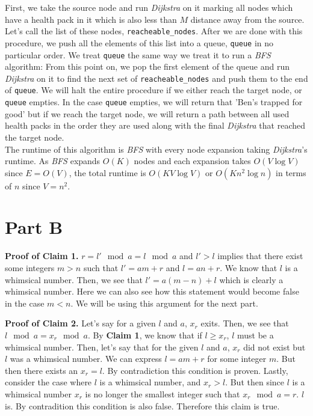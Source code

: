 \documentclass[12pt,twoside]{article}
\begin{document}
\begin{problems}
First, we take the source node and run \emph{Dijkstra} on it marking all nodes which have a health pack in it which is also less than $M$ distance away from the source. Let's call the list of these nodes, {\tt reacheable\_nodes}. After we are done with this procedure, we push all the elements of this list into a queue, {\tt queue} in no particular order. We treat {\tt queue} the same way we treat it to run a \emph{BFS} algorithm: From this point on, we pop the first element of the queue and run \emph{Dijkstra} on it to find the next set of {\tt reacheable\_nodes} and push them to the end of {\tt queue}. We will halt the entire procedure if we either reach the target node, or {\tt queue} empties. In the case {\tt queue} empties, we will return that 'Ben's trapped for good' but if we reach the target node, we will return a path between all used health packs in the order they are used along with the final \emph{Dijkstra} that reached the target node.\\

The runtime of this algorithm is \emph{BFS} with every node expansion taking \emph{Dijkstra}'s runtime. As \emph{BFS} expands $O(K)$ nodes and each expansion takes $O(V \log V)$ since $E = O(V)$, the total runtime is $O(K V \log V)$ or $O(K n^2 \log n)$ in terms of $n$ since $V = n^2$.


\section*{Part B}
\problem %
\begin{problemparts}

\problempart %

\textbf{Proof of Claim 1.}
$r = l' \mod a = l \mod a$ and $l' > l$ implies that there exist some integers $m > n$ such that $l' = a m + r$ and $l = a n + r$. We know that $l$ is a whimsical number. Then, we see that $l' = a (m - n) + l$ which is clearly a whimsical number. Here we can also see how this statement would become false in the case $m < n$. We will be using this argument for the next part.

\textbf{Proof of Claim 2.}
Let's say for a given $l$ and $a$, $x_r$ exits. Then, we see that $l \mod a = x_r \mod a$. By \textbf{Claim 1}, we know that if $l \geq x_r$, $l$ must be a whimsical number. Then, let's say that for the given $l$ and $a$, $x_r$ did not exist but $l$ was a whimsical number. We can express $l = a m + r$ for some integer $m$. But then there exists an $x_r = l$. By contradiction this condition is proven. Lastly, consider the case where $l$ is a whimsical number, and $x_r > l$. But then since $l$ is a whimsical number $x_r$ is no longer the smallest integer such that $x_r \mod a = r$. $l$ is. By contradition this condition is also false. Therefore this claim is true.


\end{problemparts}
\end{problems}
\end{document}
